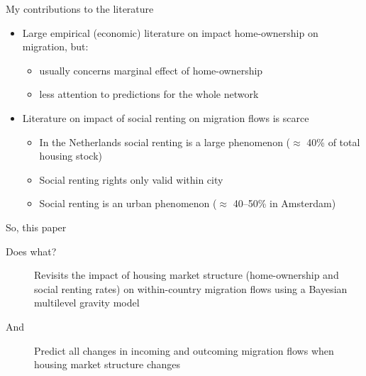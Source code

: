 \documentclass{beamer}
\begin{document}
\begin{frame}{My contributions to the literature}
  \begin{itemize}
  \item Large empirical (economic) literature on impact home-ownership on migration, but:
    \begin{itemize}
    \item usually concerns \alert{marginal} effect of home-ownership
    \item less attention to \alert{predictions} for the whole network\newline
    \end{itemize}
  \item Literature on impact of social renting on migration flows is
    scarce \citep{de2009homeownership}
	\begin{itemize}
        \item In the Netherlands social renting is a large phenomenon
          ($\approx$ 40\% of total housing stock)
        \item Social renting rights only valid \alert{within} city
          \citep{boyle1998migration}
        \item Social renting is an \alert{urban} phenomenon ($\approx$
          40--50\% in Amsterdam) 
        \end{itemize}
\end{itemize}
\end{frame}

\begin{frame}{So, this paper}
  \begin{description}
  \item[Does what?] \alert{Revisits} the impact of housing market
    structure (home-ownership and social renting rates) on within-country
    migration flows using a Bayesian multilevel gravity model
    \citep{congdon2010random} \newline
  \item[And] \alert{Predict} all changes in incoming and
    outcoming migration flows when housing market structure changes
\end{description}
\end{frame}
\end{document}
